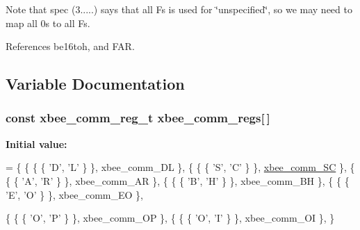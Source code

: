 Note that spec (3.....) says that all Fs is used for \char`\"{}unspecified\char`\"{}, so we may need to map all 0s to all Fs. 

References be16toh, and F\-A\-R.



\subsection{Variable Documentation}
\hypertarget{group__xbee__commissioning_ga010b1bb0118167125a07e4bde6db5e36}{
\subsubsection[{xbee\-\_\-comm\-\_\-regs}]{\setlength{\rightskip}{0pt plus 5cm}const {\bf xbee\-\_\-comm\-\_\-reg\-\_\-t} xbee\-\_\-comm\-\_\-regs\mbox{[}$\,$\mbox{]}}}\label{group__xbee__commissioning_ga010b1bb0118167125a07e4bde6db5e36}
{\bfseries Initial value\-:}
\begin{DoxyCode}
= \{
   \{ \{ \{ \textcolor{charliteral}{'D'}, \textcolor{charliteral}{'L'} \} \}, xbee\_comm\_DL \},
   \{ \{ \{ \textcolor{charliteral}{'S'}, \textcolor{charliteral}{'C'} \} \}, \hyperlink{group__xbee__commissioning_ga886012f757de4a74d0c992d3ab04a373}{xbee\_comm\_SC} \},
   \{ \{ \{ \textcolor{charliteral}{'A'}, \textcolor{charliteral}{'R'} \} \}, xbee\_comm\_AR \},
   \{ \{ \{ \textcolor{charliteral}{'B'}, \textcolor{charliteral}{'H'} \} \}, xbee\_comm\_BH \},
   \{ \{ \{ \textcolor{charliteral}{'E'}, \textcolor{charliteral}{'O'} \} \}, xbee\_comm\_EO \},
   
   \{ \{ \{ \textcolor{charliteral}{'O'}, \textcolor{charliteral}{'P'} \} \}, xbee\_comm\_OP \},
   \{ \{ \{ \textcolor{charliteral}{'O'}, \textcolor{charliteral}{'I'} \} \}, xbee\_comm\_OI \},
\}
\end{DoxyCode}
